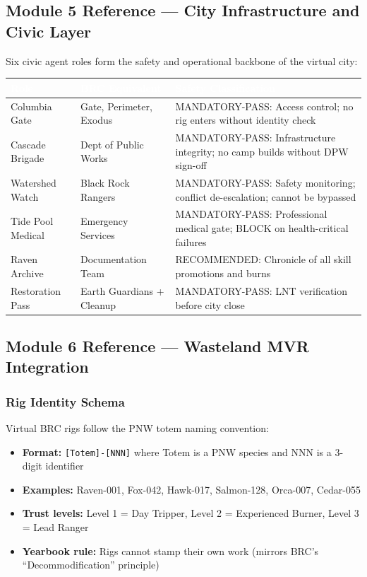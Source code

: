 \documentclass[11pt,letterpaper]{article}
\newcommand{\tableheader}[1]{\textbf{\sffamily\textcolor{white}{#1}}}
\begin{document}
\subsection{Module 5 Reference --- City Infrastructure and Civic Layer}

Six civic agent roles form the safety and operational backbone of the virtual city:

\begin{center}
\begin{tabularx}{\textwidth}{L{3cm}L{3cm}X}
\toprule
{}
\tableheader{Role} & \tableheader{BRC Equivalent} & \tableheader{Safety Classification} \\
\midrule
Columbia Gate & Gate, Perimeter, Exodus & MANDATORY-PASS: Access control; no rig enters without identity check \\
Cascade Brigade & Dept of Public Works & MANDATORY-PASS: Infrastructure integrity; no camp builds without DPW sign-off \\
Watershed Watch & Black Rock Rangers & MANDATORY-PASS: Safety monitoring; conflict de-escalation; cannot be bypassed \\
Tide Pool Medical & Emergency Services & MANDATORY-PASS: Professional medical gate; BLOCK on health-critical failures \\
Raven Archive & Documentation Team & RECOMMENDED: Chronicle of all skill promotions and burns \\
Restoration Pass & Earth Guardians + Cleanup & MANDATORY-PASS: LNT verification before city close \\
\bottomrule
\end{tabularx}
\end{center}

\subsection{Module 6 Reference --- Wasteland MVR Integration}

\subsubsection{Rig Identity Schema}

Virtual BRC rigs follow the PNW totem naming convention:
\begin{itemize}[noitemsep]
  \item \textbf{Format:} \texttt{[Totem]-[NNN]} where Totem is a PNW species and NNN is a 3-digit identifier
  \item \textbf{Examples:} Raven-001, Fox-042, Hawk-017, Salmon-128, Orca-007, Cedar-055
  \item \textbf{Trust levels:} Level 1 = Day Tripper, Level 2 = Experienced Burner, Level 3 = Lead Ranger
  \item \textbf{Yearbook rule:} Rigs cannot stamp their own work (mirrors BRC's ``Decommodification'' principle)
\end{itemize}
\end{document}
